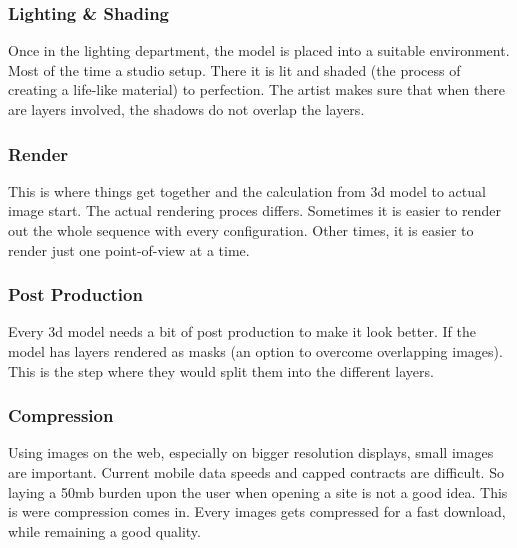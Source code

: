 \subsubsection{Lighting \& Shading}
Once in the lighting department, the model is placed into a suitable environment. Most of the time a studio setup. There it is lit and shaded (the process of creating a life-like material) to perfection. The artist makes sure that when there are layers involved, the shadows do not overlap the layers.
\subsubsection{Render}
This is where things get together and the calculation from 3d model to actual image start. The actual rendering proces differs. Sometimes it is easier to render out the whole sequence with every configuration. Other times, it is easier to render just one point-of-view at a time.


\subsubsection{Post Production}
Every 3d model needs a bit of post production to make it look better. If the model has layers rendered as masks (an option to overcome overlapping images). This is the step where they would split them into the different layers.
\subsubsection{Compression}
Using images on the web, especially on bigger resolution displays, small images are important. Current mobile data speeds and capped contracts are difficult. So laying a 50mb burden upon the user when opening a site is not a good idea. This is were compression comes in. Every images gets compressed for a fast download, while remaining a good quality.
